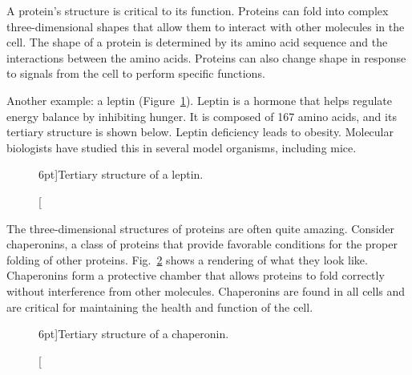 A protein's structure is critical to its function. Proteins can fold into complex three-dimensional shapes that allow them to interact with other molecules in the cell. The shape of a protein is determined by its amino acid sequence and the interactions between the amino acids. Proteins can also change shape in response to signals from the cell to perform specific functions.

Another example: a leptin (Figure~\ref{fig:leptin}). Leptin is a hormone that helps regulate energy balance by inhibiting hunger. It is composed of 167 amino acids, and its tertiary structure is shown below. Leptin deficiency leads to obesity. Molecular biologists have studied this in several model organisms, including mice.

\begin{figure}
    \caption[][6pt]{Tertiary structure of a leptin.}
    \label{fig:leptin}
\end{figure}

The three-dimensional structures of proteins are often quite amazing. Consider chaperonins, a class of proteins that provide favorable conditions for the proper folding of other proteins. Fig.~\ref{fig:chaperonin} shows a rendering of what they look like. Chaperonins form a protective chamber that allows proteins to fold correctly without interference from other molecules. Chaperonins are found in all cells and are critical for maintaining the health and function of the cell.
    
\begin{figure}
    \caption[][6pt]{Tertiary structure of a chaperonin.}
    \label{fig:chaperonin}
\end{figure}

